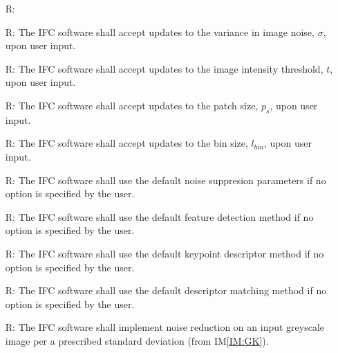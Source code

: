\documentclass[12pt]{article}
\newcommand{\iref}[1]{IM\ref{#1}}
\newcounter{reqnum} %
\begin{document}
\noindent \begin{itemize}

\item[R\refstepcounter{reqnum}\thereqnum \label{R_Inputs}:] 

\item[R\refstepcounter{reqnum}\thereqnum \label{R:Update_SD}:] The IFC software shall accept 
updates to the variance in image noise,  $\mathit{\sigma}$, upon user input.

\item[R\refstepcounter{reqnum}\thereqnum \label{R:Update_Intensity}:] The IFC software shall accept 
updates to the image intensity threshold, $\mathit{t}$, upon user input.

\item[R\refstepcounter{reqnum}\thereqnum \label{R:Update_Patch}:] The IFC software shall accept 
updates to the patch size, $\mathit{p_{s}}$, upon user input.

\item[R\refstepcounter{reqnum}\thereqnum \label{R:Update_BinSize}:] The IFC software shall accept 
updates to the bin size, $\mathit{l_{bin}}$, upon user input.

\item[R\refstepcounter{reqnum}\thereqnum \label{R:Default_Noise}:] The IFC software shall use the 
default noise suppresion parameters if no option is specified by the user.

\item[R\refstepcounter{reqnum}\thereqnum \label{R:Default_FD}:] The IFC software shall use the 
default feature detection method if no option is specified by the user.

\item[R\refstepcounter{reqnum}\thereqnum \label{R:Default_KD}:] The IFC software shall use the 
default keypoint descriptor method if no option is specified by the user.

\item[R\refstepcounter{reqnum}\thereqnum \label{R:Default_FM}:] The IFC software shall use the 
default descriptor matching method if no option is specified by the user.

\item[R\refstepcounter{reqnum}\thereqnum \label{R:NoiseReduction}:] The IFC software shall 
implement noise reduction on an input greyscale image per a prescribed standard deviation (from 
\iref{IM:GK}).


\end{itemize}
\end{document}
